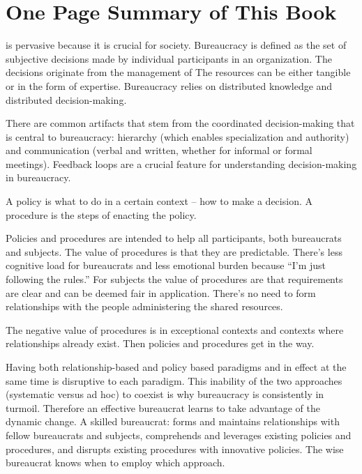 \section*{One Page Summary of This Book}

\iftoggle{glossarysubstitutionworks}{\Gls{bureaucracy}}{Bureaucracy} is pervasive because it is crucial for society. Bureaucracy is defined as the set of subjective decisions made by individual participants in an organization. The decisions originate from the 
management of \iftoggle{glossarysubstitutionworks}{\glspl{shared resource}.}{shared resources.} 
The resources can be either tangible or in the form of expertise. Bureaucracy relies on
distributed knowledge and distributed decision-making.

There are common artifacts that stem from the coordinated decision-making that is central to bureaucracy: hierarchy (which enables specialization and authority) and communication (verbal and written, whether for informal or formal meetings). 
Feedback loops are a crucial feature for understanding decision-making in bureaucracy.



A policy is what to do in a certain context -- how to make a decision. A procedure is the steps of enacting the policy.

Policies and procedures are intended to help all participants, both bureaucrats and subjects. The value of procedures is that they are predictable. There's less cognitive load for bureaucrats and less emotional burden because ``I'm just following the rules.'' For subjects the value of procedures are that requirements are clear and can be deemed fair in application. There's no need to form relationships with the people administering the shared resources.

The negative value of procedures is in exceptional contexts and contexts where relationships already exist. Then policies and procedures get in the way.

Having both relationship-based and policy based paradigms and in effect at the same time is disruptive to each paradigm.  This inability of the two approaches (systematic versus ad hoc) to coexist is why bureaucracy is consistently in turmoil. Therefore an effective bureaucrat learns to take advantage of the dynamic change. A skilled bureaucrat:
forms and maintains relationships with fellow bureaucrats and subjects,
comprehends and leverages existing policies and procedures, and 
disrupts existing procedures with innovative policies.
The wise bureaucrat knows when to employ which approach. 

